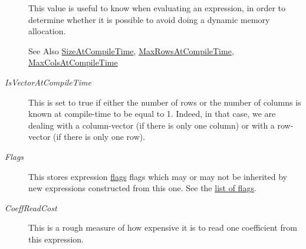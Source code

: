 \begin{Desc}
\begin{description}
This value is useful to know when evaluating an expression, in order to determine whether it is possible to avoid doing a dynamic memory allocation.

\begin{DoxySeeAlso}{See Also}
\hyperlink{class_matrix_base_aaa53a8ec1bc1ba52b1e50631dac15d6da74e612bdee777aa1924cbd37b5e298a4}{Size\-At\-Compile\-Time}, \hyperlink{class_matrix_base_aaa53a8ec1bc1ba52b1e50631dac15d6da73ed130d060f18903c34624ccb8c9894}{Max\-Rows\-At\-Compile\-Time}, \hyperlink{class_matrix_base_aaa53a8ec1bc1ba52b1e50631dac15d6da3e5f3bde791fd2f758a9f757e046b2ef}{Max\-Cols\-At\-Compile\-Time} 
\end{DoxySeeAlso}
\item[{\em 
\hypertarget{class_matrix_base_aaa53a8ec1bc1ba52b1e50631dac15d6da89bd68fc43a372f1b3e0038d16397d8f}{Is\-Vector\-At\-Compile\-Time}\label{class_matrix_base_aaa53a8ec1bc1ba52b1e50631dac15d6da89bd68fc43a372f1b3e0038d16397d8f}
}]This is set to true if either the number of rows or the number of columns is known at compile-\/time to be equal to 1. Indeed, in that case, we are dealing with a column-\/vector (if there is only one column) or with a row-\/vector (if there is only one row). \item[{\em 
\hypertarget{class_matrix_base_aaa53a8ec1bc1ba52b1e50631dac15d6da93aaf6d335b45cee8730ee9ebdef6f33}{Flags}\label{class_matrix_base_aaa53a8ec1bc1ba52b1e50631dac15d6da93aaf6d335b45cee8730ee9ebdef6f33}
}]This stores expression \hyperlink{group__flags}{flags} flags which may or may not be inherited by new expressions constructed from this one. See the \hyperlink{group__flags}{list of flags}. \item[{\em 
\hypertarget{class_matrix_base_aaa53a8ec1bc1ba52b1e50631dac15d6da9b78e19bdb6cc34bcff3a4ccef118291}{Coeff\-Read\-Cost}\label{class_matrix_base_aaa53a8ec1bc1ba52b1e50631dac15d6da9b78e19bdb6cc34bcff3a4ccef118291}
}]This is a rough measure of how expensive it is to read one coefficient from this expression. \end{description}
\end{Desc}


